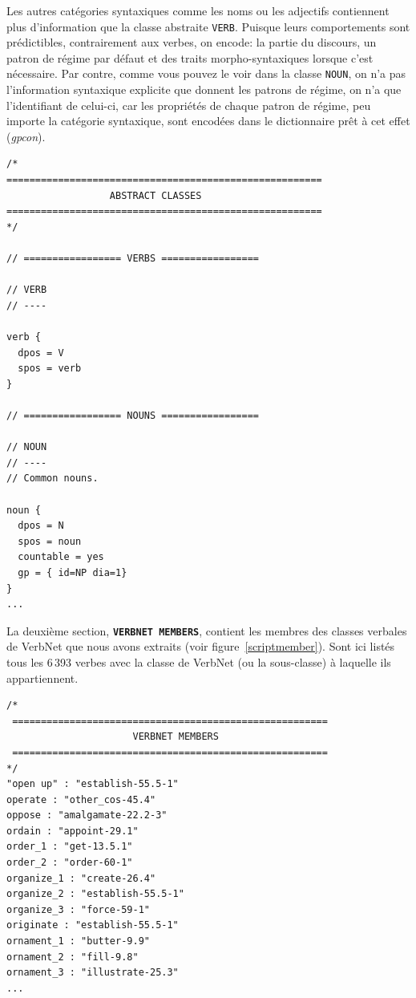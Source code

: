 Les autres catégories syntaxiques comme les noms ou les adjectifs contiennent plus d'information que la classe abstraite \texttt{VERB}. Puisque leurs comportements sont prédictibles, contrairement aux verbes, on encode: la partie du discours, un patron de régime par défaut et des traits morpho-syntaxiques lorsque c'est nécessaire. Par contre, comme vous pouvez le voir dans la classe \texttt{NOUN}, on n'a pas l'information syntaxique explicite que donnent les patrons de régime, on n'a que l'identifiant de celui-ci, car les propriétés de chaque patron de régime, peu importe la catégorie syntaxique, sont encodées dans le dictionnaire prêt à cet effet (\emph{gpcon}).

\begin{lstlisting}[language=mate, caption = Extrait du \emph{lexicon}: attributs par défaut des classes génériques, label=classedef]
/*
=======================================================
                  ABSTRACT CLASSES
=======================================================
*/

// ================= VERBS =================

// VERB
// ----

verb {
  dpos = V
  spos = verb
}

// ================= NOUNS =================

// NOUN
// ----
// Common nouns.

noun {
  dpos = N
  spos = noun
  countable = yes
  gp = { id=NP dia=1}
}
...
\end{lstlisting}

La deuxième section, \textbf{\texttt{VERBNET MEMBERS}}, contient les membres des classes verbales de VerbNet que nous avons extraits (voir figure~\ref{scriptmember}). Sont ici listés tous les 6\,393 verbes avec la classe de VerbNet (ou la sous-classe) à laquelle ils appartiennent.

\begin{lstlisting}[language=mate, caption = Extrait du \emph{lexicon}: unités lexicales verbales]
/*
 =======================================================
                      VERBNET MEMBERS
 =======================================================
*/
"open up" : "establish-55.5-1"
operate : "other_cos-45.4"
oppose : "amalgamate-22.2-3"
ordain : "appoint-29.1"
order_1 : "get-13.5.1"
order_2 : "order-60-1"
organize_1 : "create-26.4"
organize_2 : "establish-55.5-1"
organize_3 : "force-59-1"
originate : "establish-55.5-1"
ornament_1 : "butter-9.9"
ornament_2 : "fill-9.8"
ornament_3 : "illustrate-25.3"
...
\end{lstlisting}

